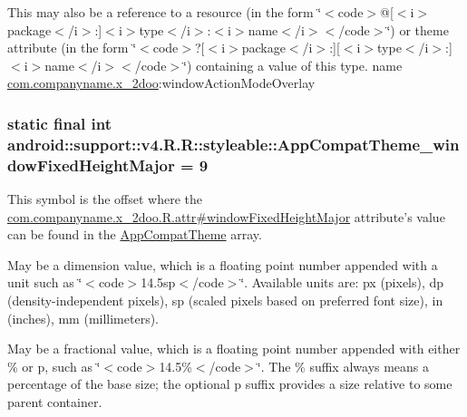 This may also be a reference to a resource (in the form \char`\"{}$<$code$>$@\mbox{[}$<$i$>$package$<$/i$>$:\mbox{]}$<$i$>$type$<$/i$>$:$<$i$>$name$<$/i$>$$<$/code$>$\char`\"{}) or theme attribute (in the form \char`\"{}$<$code$>$?\mbox{[}$<$i$>$package$<$/i$>$:\mbox{]}\mbox{[}$<$i$>$type$<$/i$>$:\mbox{]}$<$i$>$name$<$/i$>$$<$/code$>$\char`\"{}) containing a value of this type.  name \hyperlink{namespacecom_1_1companyname_1_1x__2doo}{com.companyname.x\_\-2doo}:windowActionModeOverlay \hypertarget{classandroid_1_1support_1_1v4_1_1_r_1_1styleable_bf982bf851eb06a495f5ea786cf2972e}{
\subsubsection[{AppCompatTheme\_\-windowFixedHeightMajor}]{\setlength{\rightskip}{0pt plus 5cm}static final int android::support::v4.R.R::styleable::AppCompatTheme\_\-windowFixedHeightMajor = 9}}
\label{classandroid_1_1support_1_1v4_1_1_r_1_1styleable_bf982bf851eb06a495f5ea786cf2972e}


This symbol is the offset where the \hyperlink{classcom_1_1companyname_1_1x__2doo_1_1_r_1_1attr_a910257322d4af4a914613b5f7ddd537}{com.companyname.x\_\-2doo.R.attr\#windowFixedHeightMajor} attribute's value can be found in the \hyperlink{classandroid_1_1support_1_1v4_1_1_r_1_1styleable_0873e92ba21076bb5a4aeadeb7f5779f}{AppCompatTheme} array.

May be a dimension value, which is a floating point number appended with a unit such as \char`\"{}$<$code$>$14.5sp$<$/code$>$\char`\"{}. Available units are: px (pixels), dp (density-independent pixels), sp (scaled pixels based on preferred font size), in (inches), mm (millimeters). 

May be a fractional value, which is a floating point number appended with either \% or p, such as \char`\"{}$<$code$>$14.5\%$<$/code$>$\char`\"{}. The \% suffix always means a percentage of the base size; the optional p suffix provides a size relative to some parent container. 

